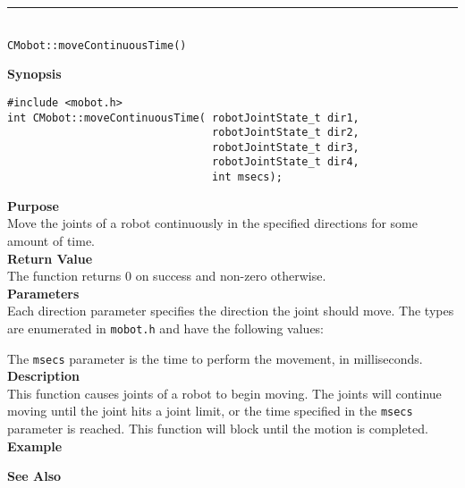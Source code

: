 \noindent
\vspace{5pt}
\rule{4.5in}{0.015in}\\
\noindent
{\LARGE \texttt{CMobot::moveContinuousTime()}}\\
{}

\noindent
{\bf Synopsis}
\vspace{-8pt}
\begin{verbatim}
#include <mobot.h>
int CMobot::moveContinuousTime( robotJointState_t dir1, 
                                robotJointState_t dir2, 
                                robotJointState_t dir3, 
                                robotJointState_t dir4, 
                                int msecs);
\end{verbatim}

\noindent
{\bf Purpose}\\
Move the joints of a robot continuously in the specified directions for some amount of time.\\

\noindent
{\bf Return Value}\\
The function returns 0 on success and non-zero otherwise.\\

\noindent
{\bf Parameters}\\
Each direction parameter specifies the direction the joint should move. The types
are enumerated in \texttt{mobot.h} and have the following values:

The \texttt{msecs} parameter is the time to perform the movement, in milliseconds.
\\

\noindent
{\bf Description}\\
This function causes joints of a robot to begin moving. The joints will continue moving
until the joint hits a joint limit, or the time specified in the \texttt{msecs} parameter
is reached. This function will block until the motion is completed.\\

\noindent
{\bf Example}\\
\noindent

\noindent
{\bf See Also}\\

